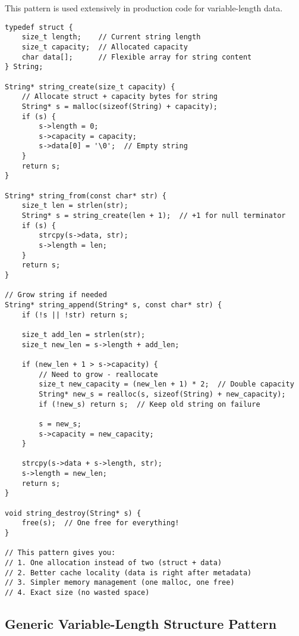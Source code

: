 This pattern is used extensively in production code for variable-length data.

\begin{lstlisting}
typedef struct {
    size_t length;    // Current string length
    size_t capacity;  // Allocated capacity
    char data[];      // Flexible array for string content
} String;

String* string_create(size_t capacity) {
    // Allocate struct + capacity bytes for string
    String* s = malloc(sizeof(String) + capacity);
    if (s) {
        s->length = 0;
        s->capacity = capacity;
        s->data[0] = '\0';  // Empty string
    }
    return s;
}

String* string_from(const char* str) {
    size_t len = strlen(str);
    String* s = string_create(len + 1);  // +1 for null terminator
    if (s) {
        strcpy(s->data, str);
        s->length = len;
    }
    return s;
}

// Grow string if needed
String* string_append(String* s, const char* str) {
    if (!s || !str) return s;

    size_t add_len = strlen(str);
    size_t new_len = s->length + add_len;

    if (new_len + 1 > s->capacity) {
        // Need to grow - reallocate
        size_t new_capacity = (new_len + 1) * 2;  // Double capacity
        String* new_s = realloc(s, sizeof(String) + new_capacity);
        if (!new_s) return s;  // Keep old string on failure

        s = new_s;
        s->capacity = new_capacity;
    }

    strcpy(s->data + s->length, str);
    s->length = new_len;
    return s;
}

void string_destroy(String* s) {
    free(s);  // One free for everything!
}

// This pattern gives you:
// 1. One allocation instead of two (struct + data)
// 2. Better cache locality (data is right after metadata)
// 3. Simpler memory management (one malloc, one free)
// 4. Exact size (no wasted space)
\end{lstlisting}

\subsection{Generic Variable-Length Structure Pattern}

